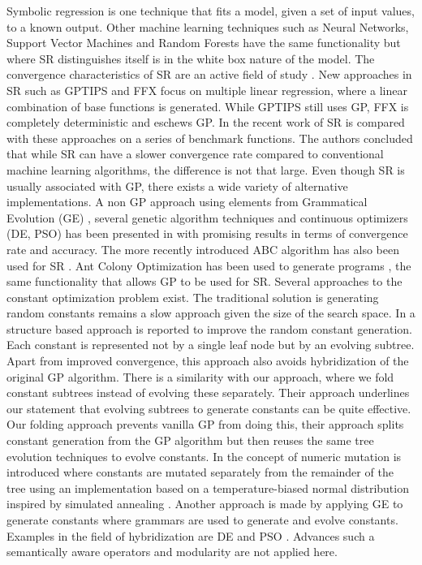 Symbolic regression is one technique that fits a model, given a set of input values, to a known output. Other machine learning techniques such as Neural Networks, Support Vector Machines and Random Forests have the same functionality but where SR distinguishes itself is in the white box nature of the model. The convergence characteristics of SR are an active field of study \citep{SRAccur}. New approaches in SR such as GPTIPS and FFX \citep{GPTIPS, FFX} focus on multiple linear regression, where a linear combination of base functions is generated. While GPTIPS still uses GP, FFX is completely deterministic and eschews GP.
In the recent work of \citep{SRlinear} SR is compared with these approaches on a series of benchmark functions. The authors concluded that while SR can have a slower convergence rate compared to conventional machine learning algorithms, the difference is not that large. Even though SR is usually associated with GP, there exists a wide variety of alternative implementations.
A non GP approach using elements from Grammatical Evolution (GE) \cite{GE}, several genetic algorithm techniques and continuous optimizers (DE, PSO) has been presented in \citep{AEG} with promising results in terms of convergence rate and accuracy. The more recently introduced ABC algorithm has also been used for SR \cite{ABCSR}. Ant Colony Optimization \citep{ACO} has been used to generate programs \citep{ACOSR}, the same functionality that allows GP to be used for SR. Several approaches to the constant optimization problem exist. The traditional solution is generating random constants \citep{GP} remains a slow approach given the size of the search space. In \citep{GPConstAlter} a structure based approach is reported to improve the random constant generation. Each constant is represented not by a single leaf node but by an evolving subtree. Apart from improved convergence, this approach also avoids hybridization of the original GP algorithm. There is a similarity with our approach, where we fold constant subtrees instead of evolving these separately. Their approach underlines our statement that evolving subtrees to generate constants can be quite effective. Our folding approach prevents vanilla GP from doing this, their approach splits constant generation from the GP algorithm but then reuses the same tree evolution techniques to evolve constants. In \citep{GPConst} the concept of numeric mutation is introduced where constants are mutated separately from the remainder of the tree using an implementation based on a temperature-biased normal distribution inspired by simulated annealing \citep{SA}. Another approach is made by applying GE to generate constants \citep{GPConstGE} where grammars are used to generate and evolve constants. Examples in the field of hybridization are DE \citep{GPDE} and PSO \citep{SRBaseline}. Advances such a semantically aware operators \citep {GPSemantics} and modularity are not applied here. 

